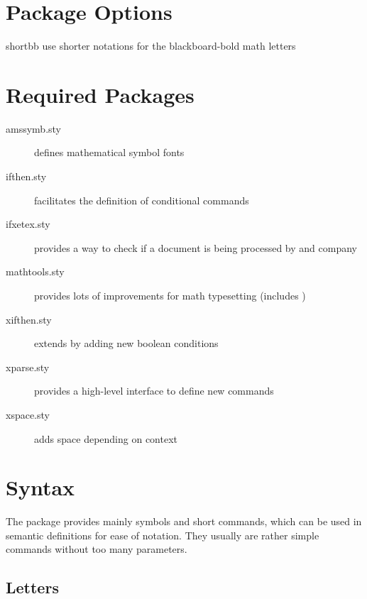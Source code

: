 \documentclass[english,a4paper,DIV=12,parskip=full,oneside]{scrartcl}
\begin{document}
    \section{Package Options}
        \label{sec:package-options}
        \begin{commandlist}
            \item[shortbb] use shorter notations for the blackboard-bold math letters \codeCommand{\C, \K, \N, \Q, \R, \Z}
        \end{commandlist}

    \section{Required Packages}
        \label{sec:required-packages}
        \begin{description}
            \item[amssymb.sty] defines mathematical symbol fonts
            \item[ifthen.sty] facilitates the definition of conditional commands
            \item[ifxetex.sty] provides a way to check if a document is being processed by \XeTeX{} and company
            \item[mathtools.sty] provides lots of improvements for math typesetting (includes )
            \item[xifthen.sty] extends  by adding new boolean conditions
            \item[xparse.sty] provides a high-level interface to define new commands
            \item[xspace.sty] adds space depending on context
        \end{description}


    \section{Syntax}
        \label{sec:syntax}

    The  package provides mainly symbols and short commands, which can be used in semantic definitions for ease of notation.
    They usually are rather simple commands without too many parameters.


    \subsection{Letters}
        \label{subsec:letters}
\end{document}
